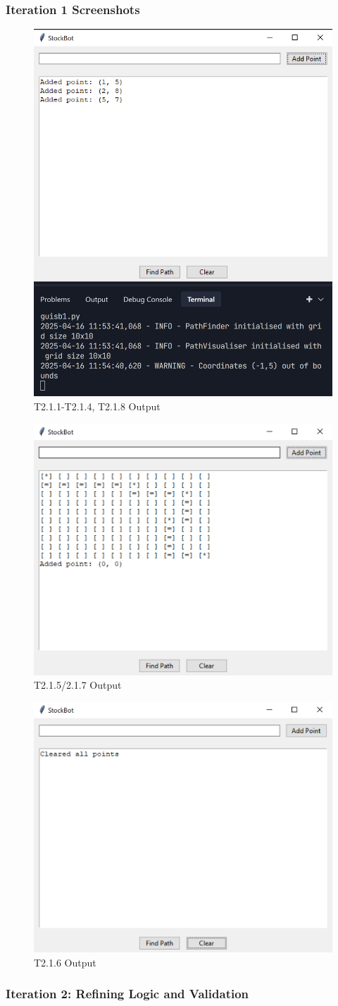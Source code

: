 \subsubsection*{Iteration 1 Screenshots}

\begin{figure}[htbp!]
	\centering
	\includegraphics[width=0.35\linewidth]{Images/sprintbtest1.png}
	\caption{T2.1.1-T2.1.4, T2.1.8 Output}
\end{figure}

\begin{figure}[htbp!]
	\centering
	\includegraphics[width=0.4\linewidth]{Images/sprintbtest2.png}
	\caption{T2.1.5/2.1.7 Output}
\end{figure}

\begin{figure}[htbp!]
	\centering
	\includegraphics[width=0.4\linewidth]{Images/sprintbtest3.png}
	\caption{T2.1.6 Output}
\end{figure}

\newpage


\subsubsection{Iteration 2: Refining Logic and Validation}

